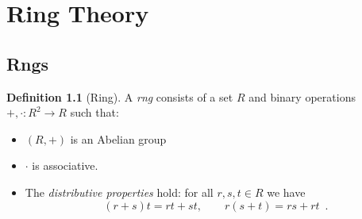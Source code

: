 \documentclass{book}
\theoremstyle{definition}
\newtheorem{df}[prop]{Definition}
\begin{document}
\part{Ring Theory}

\chapter{Rngs}

\begin{df}[Ring]
A \emph{rng} consists of a set $R$ and binary operations $+, \cdot : R^2 \rightarrow R$ such that:
\begin{itemize}
\item $(R,+)$ is an Abelian group
\item $\cdot$ is associative.
\item The \emph{distributive properties} hold: for all $r,s,t \in R$ we have
\[ (r+s)t = rt + st, \qquad r(s+t) = rs + rt \enspace .\]
\end{itemize}
\end{df}
\end{document}
